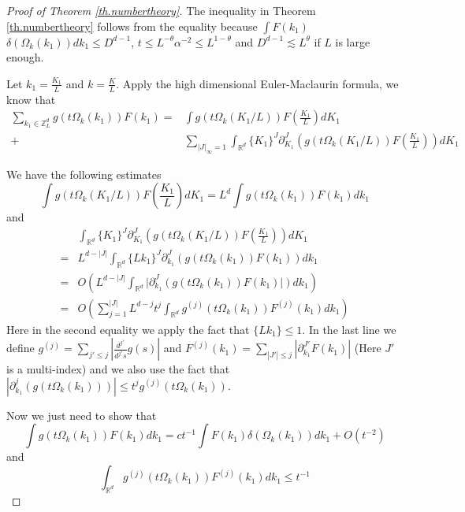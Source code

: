 \begin{proof}[Proof of Theorem \ref{th.numbertheory}] The inequality in Theorem \ref{th.numbertheory} follows from the equality because $\int F(k_1)$ $ \delta(\Omega_k(k_1)) dk_1\le D^{d-1}$, $t\le L^{-\theta}\alpha^{-2}\le L^{1-\theta}$ and $D^{d-1}\lesssim L^{\theta}$ if $L$ is large enough.

Let $k_{1}=\frac{K_1}{L}$ and $k=\frac{K}{L}$. Apply the high dimensional Euler-Maclaurin formula, we know that
\begin{equation}
\begin{split}
    \sum_{k_1\in \mathbb{Z}_L^d} g(t\Omega_k(k_1)) F(k_1)=&\int g(t\Omega_k(K_1/L)) F\left(\frac{K_1}{L}\right) dK_1 
    \\
    +& \sum_{ |J|_{\infty} = 1}\int_{\mathbb{R}^d} \{K_1\}^{J} \partial_{K_1}^{J}\left(g(t\Omega_k(K_1/L)) F\left(\frac{K_1}{L}\right)\right) dK_1
\end{split}
\end{equation}

We have the following estimates
\begin{equation}\label{eq.asymptoticlemmaeq1}
    \int g(t\Omega_k(K_1/L)) F\left(\frac{K_1}{L}\right) dK_1 =L^d\int g(t\Omega_k(k_1)) F(k_1) dk_1 
\end{equation}
and
\begin{equation}\label{eq.asymptoticlemmaeq2}
\begin{split}
    &\int_{\mathbb{R}^d} \{K_1\}^{J} \partial_{K_1}^{J}\left(g(t\Omega_k(K_1/L)) F\left(\frac{K_1}{L}\right)\right) dK_1
    \\
    = &L^{d-|J|}\int_{\mathbb{R}^d} \{Lk_1\}^{J} \partial_{k_1}^{J}\left(g(t\Omega_k(k_1)) F(k_1)\right) dk_1
    \\
    = &O\left(L^{d-|J|}\int_{\mathbb{R}^d}  |\partial_{k_1}^{J}\left(g(t\Omega_k(k_1))F(k_1)|\right) dk_1\right)
    \\
    = &O\left(\sum^{|J|}_{j=1}L^{d-j}t^{j}\int_{\mathbb{R}^d}  g^{(j)}(t\Omega_k(k_1))F^{(j)}(k_1) dk_1 \right)
\end{split}
\end{equation}
Here in the second equality we apply the fact that $\{Lk_1\}\le 1$. In the last line we define $g^{(j)}=\sum_{j'\le j} \left|\frac{d^{j'}}{d^{j'}s}g(s)\right|$ and $F^{(j)}(k_1)=\sum_{|J'|\le j}|\partial^{J'}_{k_1}F(k_1)|$ (Here $J'$ is a multi-index) and we also use the fact that $|\partial_{k_1}^{j}(g(t\Omega_k(k_1)))|\le t^{j} g^{(j)}(t\Omega_k(k_1))$. 

Now we just need to show that 
\begin{equation}\label{eq.asymptoticlemmaeq3}
    \int g(t\Omega_k(k_1)) F(k_1) dk_1 =ct^{-1} \int F(k_1) \delta(\Omega_k(k_1)) dk_1+ O(t^{-2})
\end{equation}
and 
\begin{equation}\label{eq.asymptoticlemmaeq4}
    \int_{\mathbb{R}^d}  g^{(j)}(t\Omega_k(k_1))F^{(j)}(k_1) dk_1 \le t^{-1}
\end{equation}


\end{proof}
